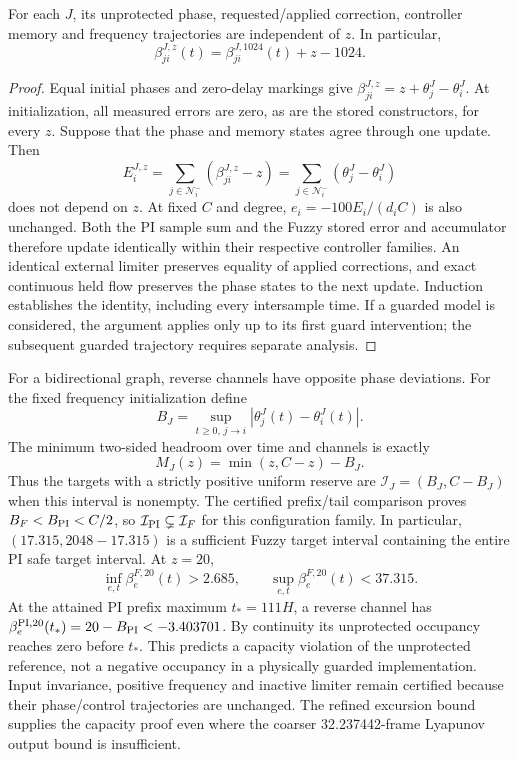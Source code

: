 \begin{btdlemma}
\label{detail:lem:btd_target_translation}
For each $J$, its unprotected phase, requested/applied correction,
controller memory and frequency trajectories are independent of $z$.
In particular,
\begin{equation}
 \beta_{ji}^{J,z}(t)=\beta_{ji}^{J,1024}(t)+z-1024.
 \label{detail:eq:btd_translation_identity}
\end{equation}
\end{btdlemma}
\begin{proof}
Equal initial phases and zero-delay markings give
$\beta_{ji}^{J,z}=z+\theta_j^J-\theta_i^J$.
At initialization, all measured errors are zero, as are the
stored constructors, for every $z$. Suppose that the phase and
memory states agree through one update. Then
\[
 E_i^{J,z}=\sum_{j\in\mathcal N_i^-}
 (\beta_{ji}^{J,z}-z)
 =\sum_{j\in\mathcal N_i^-}(\theta_j^J-\theta_i^J)
\]
does not depend on $z$. At fixed $C$ and degree,
$e_i=-100E_i/(d_iC)$ is also unchanged. Both the PI sample sum and
the Fuzzy stored error and accumulator therefore update identically
within their respective controller families. An identical external
limiter preserves equality of applied corrections, and exact
continuous held flow preserves the phase states to the next update.
Induction establishes the identity, including every intersample time.
If a guarded model is considered, the argument applies only up to
its first guard intervention; the subsequent guarded trajectory
requires separate analysis.
\end{proof}

For a bidirectional graph, reverse channels have opposite phase
deviations. For the fixed frequency initialization define
\[
 B_J=\sup_{t\ge0,\,j\to i}|\theta_j^J(t)-\theta_i^J(t)|.
\]
The minimum two-sided headroom over time and channels is exactly
\begin{equation}
 M_J(z)=\min(z,C-z)-B_J.
 \label{detail:eq:btd_translated_headroom}
\end{equation}
Thus the targets with a strictly positive uniform reserve are
$\mathcal I_J=(B_J,C-B_J)$ when this interval is nonempty.
The certified prefix/tail comparison proves $B_F<B_{\rm PI}<C/2$,
so $\mathcal I_{\rm PI}\subsetneq\mathcal I_F$ for this configuration
family. In particular, $(17.315,2048-17.315)$ is a sufficient
Fuzzy target interval containing the entire PI safe target interval.
At $z=20$,
\[
 \inf_{e,t}\beta_e^{F,20}(t)>2.685,
 \qquad \sup_{e,t}\beta_e^{F,20}(t)<37.315.
\]
At the attained PI prefix maximum $t_*=111H$, a reverse channel has
$\beta_e^{\rm PI,20}(t_*)=20-B_{\rm PI}<-3.403701$.
By continuity its unprotected occupancy reaches zero before $t_*$.
This predicts a capacity violation of the unprotected reference,
not a negative occupancy in a physically guarded implementation.
Input invariance, positive frequency and inactive limiter remain
certified because their phase/control trajectories are unchanged.
The refined excursion bound supplies the capacity proof even where
the coarser 32.237442-frame Lyapunov output bound is insufficient.

